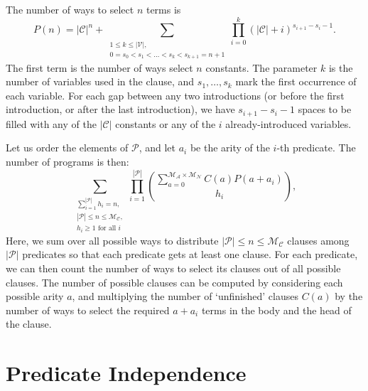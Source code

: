 \documentclass[runningheads]{llncs}
\newcommand{\predicates}{\mathcal{P}}
\newcommand{\variables}{\mathcal{V}}
\newcommand{\constants}{\mathcal{C}}
\newcommand{\maxArity}{\mathcal{M}_{\mathcal{A}}}
\newcommand{\maxNumNodes}{\mathcal{M}_{\mathcal{N}}}
\newcommand{\maxNumClauses}{\mathcal{M}_{\mathcal{C}}}
\begin{document}
The number of ways to select $n$ terms is
\[
  P(n) = |\constants{}|^n + \sum_{\substack{1 \le k \le |\variables{}|, \\ 0 =
      s_0 < s_1 < \dots < s_k < s_{k+1} = n+1}} \prod_{i=0}^k (|\constants{}| +
  i)^{s_{i+1} - s_i - 1}.
\]
The first term is the number of ways select $n$ constants. The parameter $k$ is
the number of variables used in the clause, and $s_1, \dots, s_k$ mark the first
occurrence of each variable. For each gap between any two introductions (or
before the first introduction, or after the last introduction), we have
$s_{i+1}-s_i-1$ spaces to be filled with any of the $|\constants{}|$ constants
or any of the $i$ already-introduced variables.

Let us order the elements of $\predicates{}$, and let $a_i$ be the arity of the
$i$-th predicate. The number of programs is then:
\[
  \sum_{\substack{ \sum_{i=1}^{|\predicates{}|} h_i = n,\\
      |\predicates{}| \le n \le \maxNumClauses{},\\
      h_i \ge 1 \text{ for all } i}} \prod_{i=1}^{|\predicates{}|}
  \binom{\sum_{a=0}^{\maxArity{} \times \maxNumNodes{}} C(a) P(a+a_i)}{h_i},
\]
Here, we sum over all possible ways to distribute $|\predicates{}| \le n \le
\maxNumClauses{}$ clauses among $|\predicates{}|$ predicates so that each
predicate gets at least one clause. For each predicate, we can then count the
number of ways to select its clauses out of all possible clauses. The number of
possible clauses can be computed by considering each possible arity $a$, and
multiplying the number of `unfinished' clauses $C(a)$ by the number of ways to
select the required $a+a_i$ terms in the body and the head of the clause.

\section{Predicate Independence} \label{sec:independence}
\end{document}

